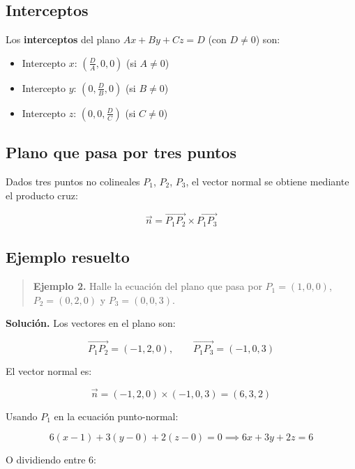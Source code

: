 \documentclass[
]{book}
\providecommand{\tightlist}{%
  \setlength{\itemsep}{0pt}\setlength{\parskip}{0pt}}
\begin{document}
\subsection{Interceptos}\label{interceptos}

Los \textbf{interceptos} del plano \(Ax + By + Cz = D\) (con \(D \neq 0\)) son:

\begin{itemize}
\tightlist
\item
  Intercepto \(x\): \(\left(\frac{D}{A}, 0, 0\right)\) (si \(A \neq 0\))
\item
  Intercepto \(y\): \(\left(0, \frac{D}{B}, 0\right)\) (si \(B \neq 0\))
\item
  Intercepto \(z\): \(\left(0, 0, \frac{D}{C}\right)\) (si \(C \neq 0\))
\end{itemize}

\subsection{Plano que pasa por tres puntos}\label{plano-que-pasa-por-tres-puntos}

Dados tres puntos no colineales \(P_1\), \(P_2\), \(P_3\), el vector normal se obtiene mediante el producto cruz:

\[
\vec{n} = \overrightarrow{P_1 P_2} \times \overrightarrow{P_1 P_3}
\]

\subsection{Ejemplo resuelto}\label{ejemplo-resuelto-3}

\begin{quote}
\textbf{Ejemplo 2.} Halle la ecuación del plano que pasa por \(P_1 = (1, 0, 0)\), \(P_2 = (0, 2, 0)\) y \(P_3 = (0, 0, 3)\).
\end{quote}

\textbf{Solución.} Los vectores en el plano son:

\[
\overrightarrow{P_1 P_2} = (-1, 2, 0), \qquad \overrightarrow{P_1 P_3} = (-1, 0, 3)
\]

El vector normal es:

\[
\vec{n} = (-1, 2, 0) \times (-1, 0, 3) = (6, 3, 2)
\]

Usando \(P_1\) en la ecuación punto-normal:

\[
6(x - 1) + 3(y - 0) + 2(z - 0) = 0 \implies 6x + 3y + 2z = 6
\]

O dividiendo entre 6:
\end{document}
